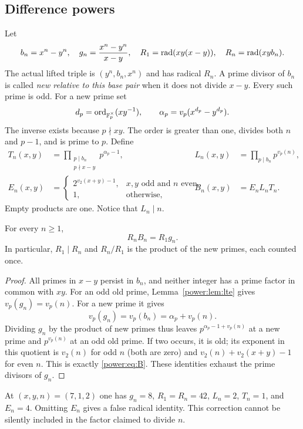 \subsection{Difference powers}
Let
\[
b_n=x^n-y^n,\quad g_n=\frac{x^n-y^n}{x-y},\quad
R_1=\operatorname{rad}(xy(x-y)),\quad R_n=\operatorname{rad}(xy b_n).
\]
The actual lifted triple is $(y^n,b_n,x^n)$ and has radical $R_n$.
A prime divisor of $b_n$ is called \emph{new relative to this base pair}
when it does not divide $x-y$. Every such prime is odd. For a new prime set
\[
d_p=\operatorname{ord}_{\mathbb F_p^\times}(xy^{-1}),\qquad
\alpha_p=v_p(x^{d_p}-y^{d_p}).
\]
The inverse exists because $p\nmid xy$. The order is greater than one,
divides both $n$ and $p-1$, and is prime to $p$. Define
\begin{align}
T_n(x,y)&=\prod_{\substack{p\mid b_n\\p\nmid x-y}}p^{\alpha_p-1},
&L_n(x,y)&=\prod_{p\mid b_n}p^{v_p(n)},\label{power:eq:TL}\\
E_n(x,y)&=
\begin{cases}
2^{v_2(x+y)-1},&x,y\text{ odd and }n\text{ even},\\
1,&\text{otherwise},
\end{cases}
&B_n(x,y)&=E_nL_nT_n.\label{power:eq:B}
\end{align}
Empty products are one. Notice that $L_n\mid n$.

\begin{theorem}\label{power:thm:balance}
For every $n\ge1$,
\begin{equation}\label{power:eq:balance}
R_n B_n=R_1 g_n.
\end{equation}
In particular, $R_1\mid R_n$ and $R_n/R_1$ is the product of the new primes,
each counted once.
\end{theorem}
\begin{proof}
All primes in $x-y$ persist in $b_n$, and neither integer has a prime factor
in common with $xy$. For an odd old prime, Lemma~\ref{power:lem:lte} gives
$v_p(g_n)=v_p(n)$. For a new prime it gives
\[
v_p(g_n)=v_p(b_n)=\alpha_p+v_p(n).
\]
Dividing $g_n$ by the product of new primes thus leaves
$p^{\alpha_p-1+v_p(n)}$ at a new prime and $p^{v_p(n)}$ at an odd old prime.
If two occurs, it is old; its exponent in this quotient is $v_2(n)$ for odd
$n$ (both are zero) and $v_2(n)+v_2(x+y)-1$ for even $n$. This is exactly
\eqref{power:eq:B}. These identities exhaust the prime divisors of $g_n$.
\end{proof}

\begin{remark}
At $(x,y,n)=(7,1,2)$ one has $g_n=8$, $R_1=R_n=42$, $L_n=2$, $T_n=1$,
and $E_n=4$. Omitting $E_n$ gives a false radical identity. This correction
cannot be silently included in the factor claimed to divide $n$.
\end{remark}

